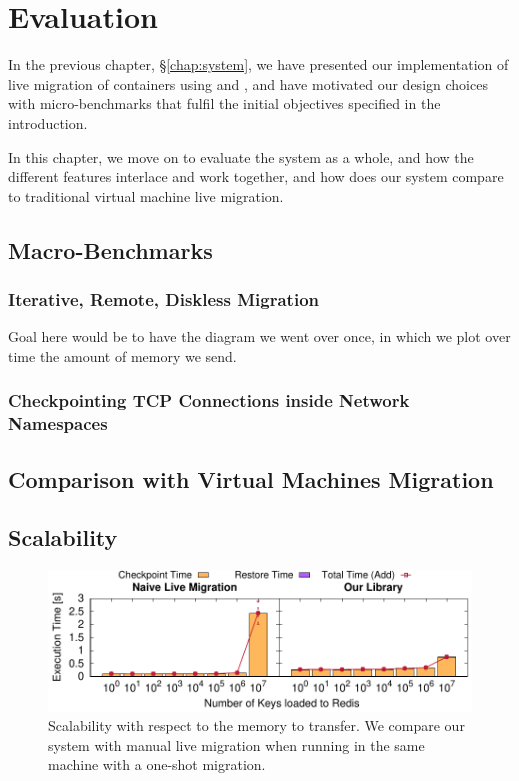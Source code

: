 \chapter{Evaluation} \label{chap:evaluation}

In the previous chapter, \S\ref{chap:system}, we have presented our implementation of live migration of containers using \criu and \runc, and have motivated our design choices with micro-benchmarks that fulfil the initial objectives specified in the introduction.

In this chapter, we move on to evaluate the system as a whole, and how the different features interlace and work together, and  how does our system compare to traditional virtual machine live migration.

\section{Macro-Benchmarks}

\subsection{Iterative, Remote, Diskless Migration}

Goal here would be to have the diagram we went over once, in which we plot over time the amount of memory we send.


\subsection{Checkpointing TCP Connections inside Network Namespaces}


\section{Comparison with Virtual Machines Migration}

\section{Scalability}

\begin{figure}
    \centering
    \includegraphics[width=\textwidth]{figs/key-scalability/key_scalability.pdf}
    \caption[Scalability with respect to the memory to transfer.]{Scalability with respect to the memory to transfer. We compare our system with manual live migration when running in the same machine with a one-shot migration.\label{fig:key-scalability}}
\end{figure}

